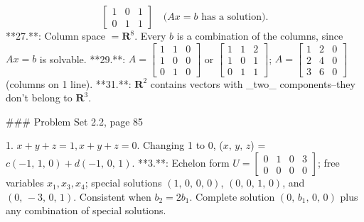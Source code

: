 \[\begin{bmatrix}1&0&1\\ 0&1&1\end{bmatrix}\quad\text{($Ax=b$ has a solution)}.\]
**27.**: Column space \(=\mathbf{R}^{8}\). Every \(b\) is a combination of the columns, since \(Ax=b\) is solvable.
**29.**: \(A=\begin{bmatrix}1&1&0\\ 1&0&0\\ 0&1&0\end{bmatrix}\) or \(\begin{bmatrix}1&1&2\\ 1&0&1\\ 0&1&1\end{bmatrix}\); \(A=\begin{bmatrix}1&2&0\\ 2&4&0\\ 3&6&0\end{bmatrix}\) (columns on 1 line).
**31.**: \(\mathbf{R}^{2}\) contains vectors with _two_ components--they don't belong to \(\mathbf{R}^{3}\).

### Problem Set 2.2, page 85

1. \(x+y+z=1,x+y+z=0\). Changing 1 to 0, (\(x,\,y,\,z\)) = \(c(-1,\,1,\,0)+d(-1,\,0,\,1)\).
**3.**: Echelon form \(U=\begin{bmatrix}0&1&0&3\\ 0&0&0&0\end{bmatrix}\); free variables \(x_{1},x_{3},x_{4}\); special solutions \((1,\,0,\,0,\,0)\), \((0,\,0,\,1,\,0)\), and \((0,\,-3,\,0,\,1)\). Consistent when \(b_{2}=2b_{1}\). Complete solution \((0,\,b_{1},\,0,\,0)\) plus any combination of special solutions.

